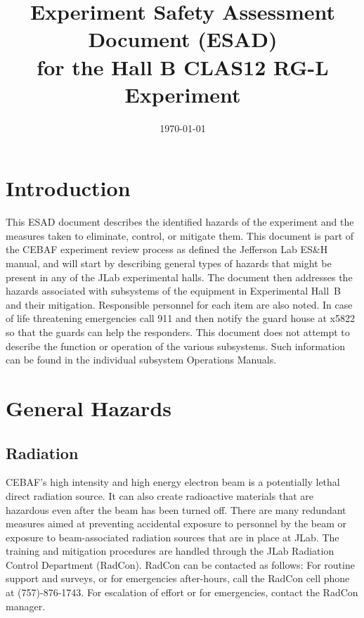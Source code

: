 \documentclass[12pt]{report}
\begin{document}
\title{Experiment Safety Assessment Document (ESAD) \\ 
  for the Hall B CLAS12 RG-L Experiment}
\date{\today}
%
%
%
\maketitle
\tableofcontents

\chapter{Introduction}

This ESAD document describes the identified hazards of the experiment and the measures 
taken to eliminate, control, or mitigate them. This document is part of the CEBAF 
experiment review process as defined the Jefferson 
Lab ES\&H manual, and will start by describing general types of hazards that might be 
present in any of the JLab experimental halls.  The document then addresses the hazards 
associated with subsystems of the equipment in Experimental Hall~B and their mitigation.  
Responsible personnel for each item are also noted. In case of life threatening emergencies 
call 911 and then notify the guard house at x5822 so that the guards can help the 
responders.  This document does not attempt to describe the function or operation of the 
various subsystems. Such information can be found in the individual subsystem Operations 
Manuals.

\chapter{General Hazards}

\section{Radiation}
	
CEBAF's high intensity and high energy electron beam is a potentially lethal direct 
radiation source. It can also create radioactive materials that are hazardous even after 
the beam has been turned off. There are many redundant measures aimed at preventing 
accidental exposure to personnel by the beam or exposure to beam-associated radiation 
sources that are in place at JLab. The training and mitigation procedures are handled 
through the JLab Radiation Control Department (RadCon). RadCon can be contacted as follows: 
For routine support and surveys, or for emergencies after-hours, call the RadCon cell phone 
at (757)-876-1743. For escalation of effort or for emergencies, contact the RadCon manager.
\end{document}
